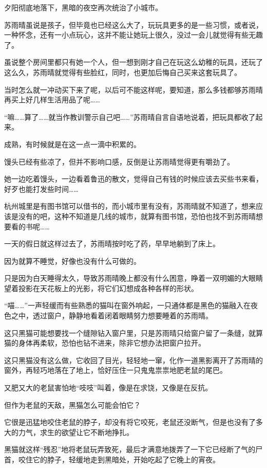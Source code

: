 夕阳彻底地落下，黑暗的夜空再次统治了小城市。

苏雨晴虽说是孩子，但毕竟也已经这么大了，玩玩具更多的是一些习惯，或者说，一种怀念，还有一小点玩心，这并不能让她玩上很久，没过一会儿就觉得有些无趣了。

虽说整个房间里都只有她一个人，但一想到刚才自己在玩这么幼稚的玩具，还玩了这么久，苏雨晴就觉得有些脸红，同时，也更加后悔自己买来这套玩具了。

当时怎么就一冲动买下来了呢，以后可不能这样呢，要知道，那么多钱都够苏雨晴再买上好几样生活用品了呢……

“嘛……算了……就当作教训警示自己吧……”苏雨晴自言自语地说着，把玩具都收了起来。

成熟，有时候就是在这一点一滴中积累的。

馒头已经有些凉了，但并不影响口感，反倒是让苏雨晴觉得更有嚼劲了。

她一边吃着馒头，一边看着鲁迅的散文，觉得自己有钱的时候应该去买些书来看，好歹也能打发些时间……

杭州城里是有图书馆可以借书的，而小城市里有没有，苏雨晴就不知道了，想来应该是没有的吧，这种不知道是几线的城市，就算有图书馆，恐怕也找不到苏雨晴想要看的书呢……

一天的假日就这样过去了，苏雨晴按时吃了药，早早地躺到了床上。

因为就算不睡觉，好像也没有什么可做的。

只是因为白天睡得太久，导致苏雨晴晚上都没有什么困意，睁着一双明媚的大眼睛望着投影在天花板上的光影，将它们幻想成各种各样的形状。

“喵……”一声轻缓而有些熟悉的猫叫在窗外响起，一只通体都是黑色的猫融入在夜色之中，透过窗户，静静地看着闭着眼睛努力想要睡着的苏雨晴。

这只黑猫可能想要找一个缝隙钻入窗户里，只是苏雨晴只给窗户留了一条缝，就算猫的身体再柔软，恐怕也钻不进来，除非它想办法把窗户拉开。

这只黑猫没有这么做，它收回了目光，轻轻地一窜，化作一道黑影离开了苏雨晴的窗外，再轻巧地落在了地上，恰好压住一只鬼鬼祟祟地肥老鼠的尾巴。

又肥又大的老鼠害怕地“吱吱”叫着，像是在求饶，又像是在反抗。

但作为老鼠的天敌，黑猫怎么可能会怕它？

它很是迅猛地咬住老鼠的脖子，却没有将它咬死，老鼠还没断气，但是也没有了多大的力气，求生的欲望让它不断地挣扎。

黑猫就这样“残忍”地将老鼠玩弄致死，最后才满意地拨弄了一下它已经断了气的尸首，咬住它的脖子，轻缓地走到黑暗处，开始吃起了它晚上的宵夜。

